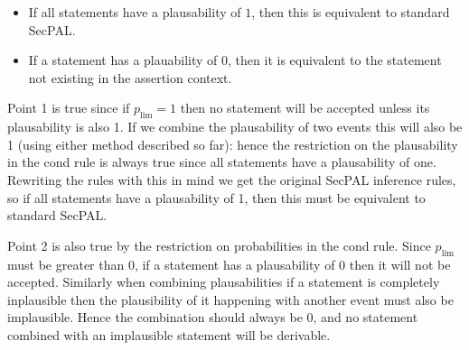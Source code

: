 \documentclass[a4paper]{article}
\begin{document}
\begin{itemize}
\item If all statements have a plausability of $1$, then this is equivalent to standard SecPAL.
\item If a statement has a plauability of $0$, then it is equivalent to the statement not existing in the assertion context.
\end{itemize}

Point 1 is true since if $p_{\text{lim}} = 1$ then no statement will be accepted unless its plausability is also 1.
If we combine the plausability of two events this will also be 1 (using either method described so far):
    hence the restriction on the plausability in the cond rule is always true since all statements have a plausability of one.
Rewriting the rules with this in mind we get the original SecPAL inference rules, so if all statements have a plausability of 1, then this must be equivalent to standard SecPAL.

Point 2 is also true by the restriction on probabilities in the cond rule.
Since $p_{\text{lim}}$ must be greater than 0, if a statement has a plausability of 0 then it will not be accepted.
Similarly when combining plausabilities if a statement is completely inplausible then the plausibility of it happening with another event must also be implausible.
Hence the combination should always be 0, and no statement combined with an implausible statement will be derivable.
\end{document}
